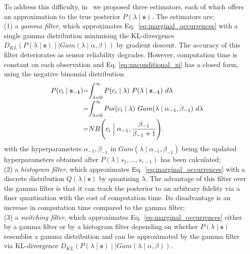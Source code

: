 To address this difficulty, in~\cite{jovan18a} we proposed three estimators, each of which offers an approximation to the true posterior $P(\lambda \mid \mathbf{s})$. The estimators are: \\
(1) a \textit{gamma filter}, which approximates Eq.~\ref{eq:marginal_occurrences} with a single gamma distribution minimising the KL-divergence $D_{KL}(P(\lambda \mid \mathbf{s}) \mid \mid Gam(\lambda \mid \alpha, \beta))$ by gradient descent. The accuracy of this filter deteriorates as sensor reliability degrades. However, computation time is constant on each observation and Eq. \ref{eq:unconditional_xi} has a closed form, using the negative binomial distribution
\begin{equation}
	\label{eq:unconditional_xi_gamma_filter}
	\begin{tabular}{r@{=}l}
		$P(c_i \mid \mathbf{s_{-1}})$ & $\displaystyle\int_{\lambda=0}^{\infty} P(c_i \mid \lambda) ~ P(\lambda \mid \mathbf{s_{-1}}) ~d\lambda$ \\ [2ex]
		& $\displaystyle\int_{\lambda=0}^{\infty} Poi(c_i \mid \lambda) ~ Gam(\lambda \mid \alpha_{-1}, \beta_{-1}) ~d\lambda$ \\ [2ex]
		& $NB\Bigg(c_i \Bigm| \alpha_{-1}, \displaystyle\frac{\beta_{-1}}{\beta_{-1} + 1}\Bigg)$.
	\end{tabular}
\end{equation}
\noindent with the hyperparameters $\alpha_{-1}, \beta_{-1}$ in $Gam(\lambda \mid \alpha_{-1}, \beta_{-1})$ being the updated hyperparameters obtained after $P(\lambda \mid s_1, \ldots, s_{i-1})$ has been calculated;\\
(2) a \textit{histogram filter}, which approximates Eq.~\ref{eq:marginal_occurrences} with a discrete distribution $Q(\lambda \mid \mathbf{s})$ by quantising $\lambda$. The advantage of this filter over the gamma filter is that it can track the posterior to an arbitrary fidelity via a finer quantisation with the cost of computation time. Its disadvantage is an increase in computation time compared to the gamma filter; \\
(3) a \textit{switching filter}, which approximates Eq.~\ref{eq:marginal_occurrences} either by a gamma filter or by a histogram filter depending on whether $P(\lambda \mid \mathbf{s})$  resembles a gamma distribution and can be approximated by the gamma filter via KL-divergence $D_{KL}(P(\lambda \mid \mathbf{s}) \mid \mid Gam(\lambda \mid \alpha, \beta))$.

